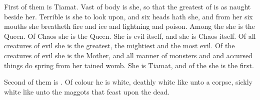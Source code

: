 First of them is Tiamat. Vast of body is she, so that the greatest of \dragons{} is as naught beside her. Terrible is she to look upon, and six heads hath she, and from her six mouths she breatheth fire and ice and lightning and poison. Among the \dragons{} she is the Queen. Of Chaos she is the Queen. She is evil itself, and she is Chaos itself. Of all creatures of evil she is the greatest, the mightiest and the most evil. Of the creatures of evil she is the Mother, and all manner of monsters and \daemons{} and accursed things do spring from her tained womb. She is Tiamat, and of the \Dominators{} she is the first. 

Second of them is \ApepNesthra. Of colour he is white, deathly white like unto a corpse, sickly white like unto the maggots that feast upon the dead. 

